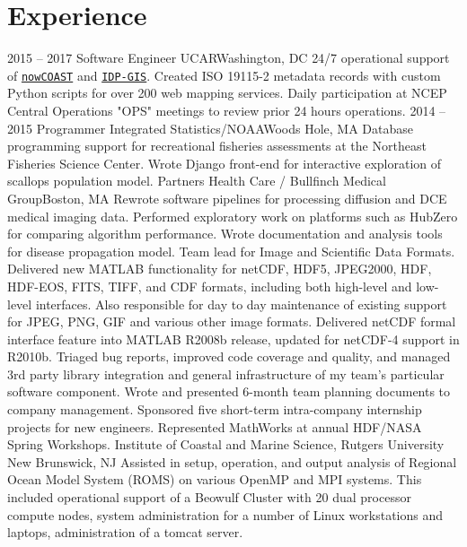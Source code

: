 \documentclass[11pt]{moderncv}  %
\begin{document}
\section{Experience}
\cventry
{2015 -- 2017}
{Software Engineer}
{UCAR}{Washington, DC}{}
{
	24/7 operational support of 
	\href{https://nowcoast.noaa.gov}{\texttt{nowCOAST}}
	and
	\href{https://idpgis.ncep.noaa.gov}{\texttt{IDP-GIS}}.  Created ISO 19115-2
	metadata records with custom Python scripts for over 200 web mapping
	services.  Daily participation at NCEP Central Operations "OPS" meetings to
	review prior 24 hours operations.
}
\cventry
{2014 -- 2015}
{Programmer}
{Integrated Statistics/NOAA}{Woods Hole, MA}{}
{
    Database programming support for recreational fisheries assessments
    at the Northeast Fisheries Science Center. Wrote Django front-end
    for interactive exploration of scallops population model.
}
{
	Partners Health Care / Bullfinch Medical Group}{Boston, MA}{}{
    Rewrote software pipelines for processing diffusion and DCE medical
    imaging data.  Performed exploratory work on platforms such as
    HubZero  for comparing algorithm performance. Wrote documentation
    and analysis tools for disease propagation model.
}
{   
    Team lead for Image and Scientific Data Formats.  Delivered
    new MATLAB functionality for netCDF, HDF5, JPEG2000, HDF,
    HDF-EOS, FITS, TIFF, and CDF formats, including both high-level
    and low-level interfaces.  Also responsible for day to day
    maintenance of existing support for JPEG, PNG, GIF and various
    other image formats.  Delivered netCDF formal interface feature
    into MATLAB R2008b release, updated for netCDF-4 support in
    R2010b. Triaged bug reports, improved code coverage and quality,
    and managed 3rd party library integration and general infrastructure
    of my team's particular software component.  Wrote and presented
    6-month team planning documents to company management.  Sponsored
    five short-term intra-company internship projects for new
    engineers.  Represented MathWorks at annual HDF/NASA Spring
    Workshops.
}
{
	Institute of Coastal and Marine Science, Rutgers University}
    {New Brunswick, NJ}{} {
    Assisted in setup,  operation, and output analysis  of Regional
    Ocean Model System (ROMS) on various OpenMP and MPI systems.
    This included operational support of a Beowulf Cluster with 20
    dual processor compute nodes, system administration for a number
    of Linux workstations and laptops, administration of a tomcat
    server.
}
\end{document}
